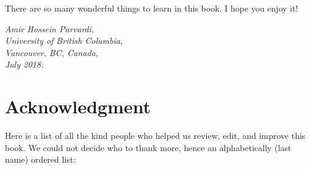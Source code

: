 \documentclass[12pt]{book}
\begin{document}
\vspace{0.3cm}

There are so many wonderful things to learn in this book. I hope you enjoy it!
\begin{flushright}
	\sl Amir Hossein Parvardi,\\
	University of British Columbia,\\
	Vancouver, BC, Canada,\\
	July 2018.
\end{flushright}


\newpage
	
\section*{Acknowledgment}

Here is a list of all the kind people who helped us review, edit, and improve this book. We could not decide who to thank more, hence an alphabetically (last name) ordered list:
\end{document}
